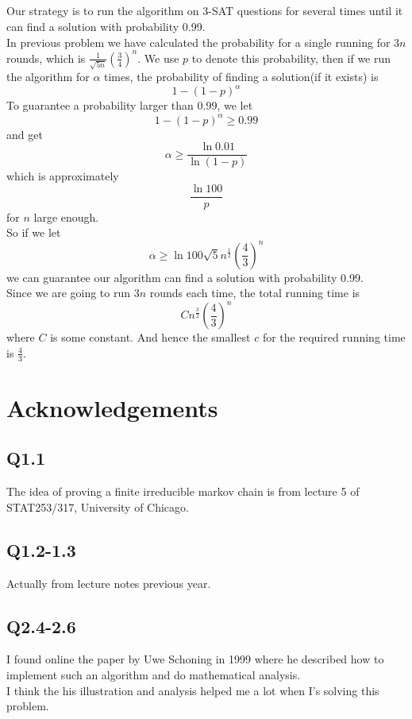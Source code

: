 \documentclass[12pt,letterpaper]{article}
\begin{document}
\subsection{}
Our strategy is to run the algorithm on 3-SAT questions for several times 
until it can find a solution with probability 0.99.\\
In previous problem we have calculated the probability for a single running for $3n$ rounds,
which is $\frac{1}{\sqrt{5n}}\left(\frac{3}{4}\right)^n$.
We use $p$ to denote this probability, 
then if we run the algorithm for $\alpha$ times, 
the probability of finding a solution(if it exists) is 
$$1-(1-p)^{\alpha}$$
To guarantee a probability larger than 0.99,
we let 
$$1-(1-p)^{\alpha}\geq 0.99$$
and get
$$\alpha\geq \frac{\ln0.01}{\ln(1-p)}$$
which is approximately 
$$\frac{\ln 100}{p}$$
for $n$ large enough.\\
So if we let 
$$\alpha\geq \ln100\sqrt{5}n^{\frac{1}{2}}\left(\frac{4}{3}\right)^n$$
we can guarantee our algorithm can find a solution with probability 0.99.\\
Since we are going to run $3n$ rounds each time,
the total running time is 
$$Cn^{\frac{3}{2}}\left(\frac{4}{3}\right)^n$$
where $C$ is some constant.
And hence the smallest $c$ for the required running time is $\frac{4}{3}$.

\newpage
\section{Acknowledgements}
\subsection*{Q1.1}
The idea of proving a finite irreducible markov chain is from lecture 5 of STAT253/317, University of Chicago.
\subsection*{Q1.2-1.3}
Actually from lecture notes previous year.
\subsection*{Q2.4-2.6}
I found online the paper by Uwe Schoning in 1999 
where he described how to implement such an algorithm and do mathematical analysis.\\
I think the his illustration and analysis helped me a lot 
when I's solving this problem.
\end{document}
